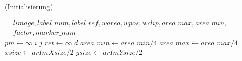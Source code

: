 \begin{algorithm}[!ht]
\caption{ (Initialisierung)}
\label{alg:detectmarker2-1}
\begin{algorithmic}[1]
	\Require $
	\begin{aligned}
		& \mathit{limage}, \mathit{label\_num}, \mathit{label\_ref}, \mathit{warea}, \mathit{wpos}, \mathit{wclip}, \mathit{area\_max}, \mathit{area\_min},\\
		& \mathit{factor}, \mathit{marker\_num}
	\end{aligned}$
	\State $\mathit{pm} \gets \infty$
	\State $i$
	\State $j$
	\State $\mathit{ret} \gets \infty$
	\State $d$
	\State $\mathit{area\_min} \gets \mathit{area\_min} / 4$
	\State $\mathit{area\_max} \gets \mathit{area\_max} / 4$
	\State $\mathit{xsize} \gets \mathit{arImXsize} / 2$
	\State $\mathit{ysize} \gets \mathit{arImYsize} / 2$
\end{algorithmic}
\end{algorithm}
